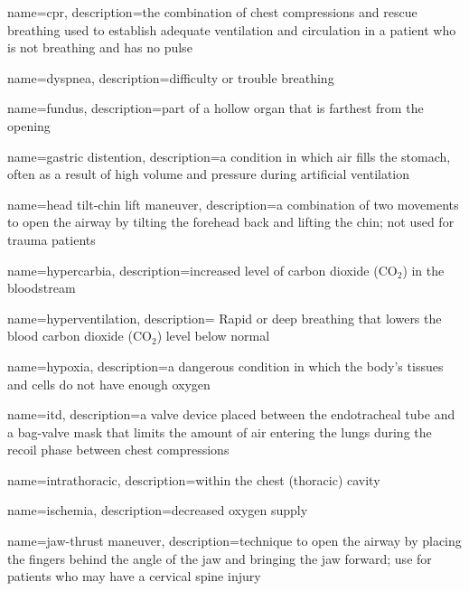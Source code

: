 \documentclass[../../EMT-169.tex]{subfiles}
\begin{document}
	{
		name=\acrfull{cpr},
		description={the combination of chest compressions and rescue breathing used to establish adequate ventilation and circulation in a patient who is not breathing and has no pulse}
	}


	{
		name=dyspnea,
		description={difficulty or trouble breathing}
	}

	{
		name=fundus,
		description={part of a hollow organ that is farthest from the opening}
	}

	{
		name=gastric distention,
		description={a condition in which air fills the stomach, often as a result of high volume and pressure during artificial ventilation}
	}

	{
		name=head tilt-chin lift maneuver,
		description={a combination of two movements to open the airway by tilting the forehead back and lifting the chin; not used for trauma patients}
	}

	{
		name=hypercarbia,
		description={increased level of carbon dioxide (\ensuremath{\mathrm{CO_2}}) in the bloodstream}
	}

	{
		name=hyperventilation,
		description={ Rapid or deep breathing that lowers the blood carbon dioxide (\ensuremath{\mathrm{CO_2}})  level below normal}
	}


	{
		name=hypoxia,
		description={a dangerous condition in which the body's tissues and cells do not have enough oxygen}
	}

	{
		name=\acrfull{itd},
		description={a valve device placed between the endotracheal tube and a bag-valve mask that limits the amount of air entering the lungs during the recoil phase between chest compressions}
	}

	{
		name=intrathoracic,
		description={within the chest (thoracic) cavity}
	}

	{
		name=ischemia,
		description={decreased oxygen supply}
	}

	{
		name=jaw-thrust maneuver,
		description={technique to open the airway by placing the fingers behind the angle of the jaw and bringing the jaw forward; use for patients who may have a cervical spine injury}
	}
\end{document}
